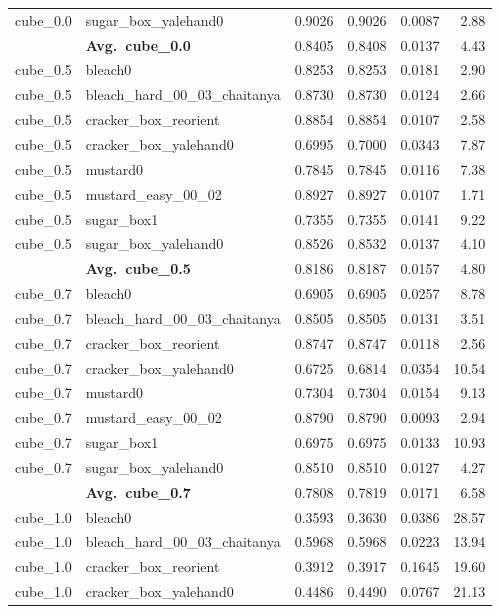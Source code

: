 \begin{longtable}{llrrrr}
  cube_0.0 & sugar\_box\_yalehand0 & 0.9026 & 0.9026 & 0.0087 & 2.88 \\
  \cmidrule{2-6}
  & \textbf{Avg.~cube_0.0} & 0.8405 & 0.8408 & 0.0137 & 4.43 \\
  \midrule
  cube_0.5 & bleach0 & 0.8253 & 0.8253 & 0.0181 & 2.90 \\
  cube_0.5 & bleach\_hard\_00\_03\_chaitanya & 0.8730 & 0.8730 & 0.0124 & 2.66 \\
  cube_0.5 & cracker\_box\_reorient & 0.8854 & 0.8854 & 0.0107 & 2.58 \\
  cube_0.5 & cracker\_box\_yalehand0 & 0.6995 & 0.7000 & 0.0343 & 7.87 \\
  cube_0.5 & mustard0 & 0.7845 & 0.7845 & 0.0116 & 7.38 \\
  cube_0.5 & mustard\_easy\_00\_02 & 0.8927 & 0.8927 & 0.0107 & 1.71 \\
  cube_0.5 & sugar\_box1 & 0.7355 & 0.7355 & 0.0141 & 9.22 \\
  cube_0.5 & sugar\_box\_yalehand0 & 0.8526 & 0.8532 & 0.0137 & 4.10 \\
  \cmidrule{2-6}
  & \textbf{Avg.~cube_0.5} & 0.8186 & 0.8187 & 0.0157 & 4.80 \\
  \midrule
  cube_0.7 & bleach0 & 0.6905 & 0.6905 & 0.0257 & 8.78 \\
  cube_0.7 & bleach\_hard\_00\_03\_chaitanya & 0.8505 & 0.8505 & 0.0131 & 3.51 \\
  cube_0.7 & cracker\_box\_reorient & 0.8747 & 0.8747 & 0.0118 & 2.56 \\
  cube_0.7 & cracker\_box\_yalehand0 & 0.6725 & 0.6814 & 0.0354 & 10.54 \\
  cube_0.7 & mustard0 & 0.7304 & 0.7304 & 0.0154 & 9.13 \\
  cube_0.7 & mustard\_easy\_00\_02 & 0.8790 & 0.8790 & 0.0093 & 2.94 \\
  cube_0.7 & sugar\_box1 & 0.6975 & 0.6975 & 0.0133 & 10.93 \\
  cube_0.7 & sugar\_box\_yalehand0 & 0.8510 & 0.8510 & 0.0127 & 4.27 \\
  \cmidrule{2-6}
  & \textbf{Avg.~cube_0.7} & 0.7808 & 0.7819 & 0.0171 & 6.58 \\
  \midrule
  cube_1.0 & bleach0 & 0.3593 & 0.3630 & 0.0386 & 28.57 \\
  cube_1.0 & bleach\_hard\_00\_03\_chaitanya & 0.5968 & 0.5968 & 0.0223 & 13.94 \\
  cube_1.0 & cracker\_box\_reorient & 0.3912 & 0.3917 & 0.1645 & 19.60 \\
  cube_1.0 & cracker\_box\_yalehand0 & 0.4486 & 0.4490 & 0.0767 & 21.13 \\

\end{longtable}
